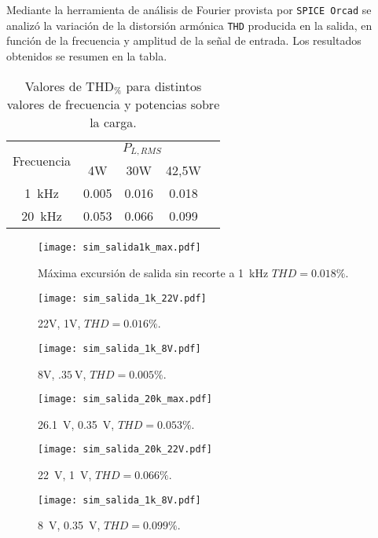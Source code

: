 	Mediante la herramienta de análisis de Fourier provista por \texttt{SPICE Orcad} se analizó la variación de la distorsión armónica \texttt{THD} producida en la salida, en función de la frecuencia y amplitud de la señal de entrada. Los resultados obtenidos se resumen en la tabla.

\begin{table}[H]
	\centering
	\begin{tabular}{ccccc}
		\toprule
\multirow{2}{*}{Frecuencia} & \multicolumn{3}{c}{$P_{L,RMS}$} \\ 
		\cmidrule{2-4}
			& 4W & 30W & 42,5W \\
		\midrule
		\SI{1}{\kHz} & \num{0,005} & \num{0,016} & \num{0,018} \\
		\SI{20}{\kHz} & \num{0.053} & \num{0,066} & \num{0,099} \\
		\bottomrule
	\end{tabular}
	\caption{Valores de $\mathrm{THD}_{\%}$ para distintos valores de frecuencia y potencias sobre la carga.}
\end{table}


\begin{figure}[H]
	\centering
	\texttt{[image: sim\_salida1k\_max.pdf]}
	\caption{Máxima excursión de salida sin recorte a \SI{1}{\kilo\hertz} $THD = \num{0.018}\%$.}
	\label{fig:sim_salida_1k_max}
	\end{figure}

\begin{figure}[H]
	\centering
	\texttt{[image: sim\_salida\_1k\_22V.pdf]}
	\caption{22V, 1V, $THD=\num{0.016}\%$.}
	\end{figure}

\begin{figure}[H]
	\centering
	\texttt{[image: sim\_salida\_1k\_8V.pdf]}
	\caption{8V, $\SI{.35}{\V}$, $THD=\num{0.005}\%$.}
\end{figure}

\begin{figure}[H]
	\centering
	\texttt{[image: sim\_salida\_20k\_max.pdf]}
	\caption{\SI{26.1}{\V}, \SI{0.35}{\V}, $THD=\num{0.053}\%$.}
\end{figure}

\begin{figure}[H]
	\centering
	\texttt{[image: sim\_salida\_20k\_22V.pdf]}
	\caption{\SI{22}{\V}, \SI{1}{\V}, $THD=\num{0.066}\%$.}
\end{figure}

\begin{figure}[H]
	\centering
	\texttt{[image: sim\_salida\_1k\_8V.pdf]}
	\caption{\SI{8}{\V}, \SI{0.35}{\V}, $THD=\num{0.099}\%$.}
\end{figure}




